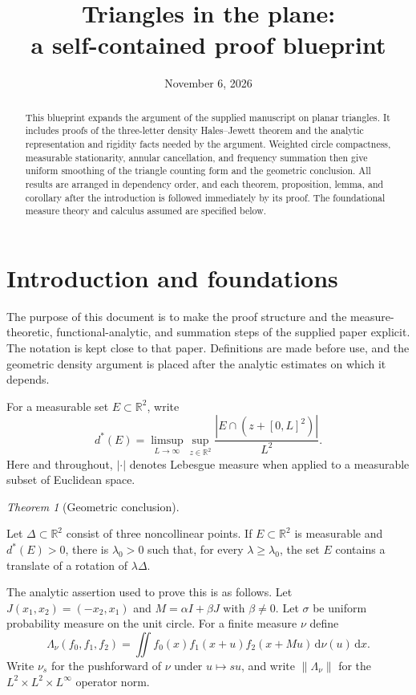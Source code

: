 \documentclass[11pt]{amsart}
\title[Blueprint: triangles in the plane]{Triangles in the plane:\\a self-contained proof blueprint}
\author{}
\date{November 6, 2026}
\newcommand{\R}{\mathbb R}
\newcommand{\dd}{\,\mathrm d}
\theoremstyle{definition}
\theoremstyle{remark}
\newtheorem{maintheorem}{Theorem}
\numberwithin{equation}{section}
\providecommand{\lean}[1]{}
\providecommand{\leanok}{}
\begin{document}
\begin{abstract}
This blueprint expands the argument of the supplied manuscript on planar
triangles.  It includes proofs of the three-letter density Hales--Jewett
theorem and the analytic representation and rigidity facts needed by the
argument.  Weighted circle compactness, measurable stationarity, annular
cancellation, and frequency summation then give uniform smoothing of the
triangle counting form and the geometric conclusion.  All results are
arranged in dependency order, and each theorem, proposition, lemma, and
corollary after the introduction is followed immediately by its proof.
The foundational measure theory and calculus assumed are specified below.
\end{abstract}
\maketitle
\tableofcontents

\section{Introduction and foundations}\label{sec:introduction}

The purpose of this document is to make the proof structure and the
measure-theoretic, functional-analytic, and summation steps of the supplied
paper explicit.  The notation is kept close to that paper.  Definitions
are made before use, and the geometric density argument is placed after
the analytic estimates on which it depends.

For a measurable set $E\subset\R^2$, write
\[
 d^*(E)=\limsup_{L\to\infty}\sup_{z\in\R^2}
       \frac{|E\cap(z+[0,L]^2)|}{L^2}.
\]
Here and throughout, $|\cdot|$ denotes Lebesgue measure when applied
to a measurable subset of Euclidean space.

\begin{maintheorem}[Geometric conclusion]\label{intro:density}
\lean{Auto.intro_density}
\leanok
Let $\Delta\subset\R^2$ consist of three noncollinear points.  If
$E\subset\R^2$ is measurable and $d^*(E)>0$, there is $\lambda_0>0$
such that, for every $\lambda\ge\lambda_0$, the set $E$ contains a
translate of a rotation of $\lambda\Delta$.
\end{maintheorem}

The analytic assertion used to prove this is as follows.  Let
$J(x_1,x_2)=(-x_2,x_1)$ and $M=\alpha I+\beta J$ with $\beta\ne0$.
Let $\sigma$ be uniform probability measure on the unit circle.  For
a finite measure $\nu$ define
\[
 \Lambda_\nu(f_0,f_1,f_2)
  =\iint f_0(x)f_1(x+u)f_2(x+Mu)\dd\nu(u)\dd x.
\]
Write $\nu_s$ for the pushforward of $\nu$ under $u\mapsto su$,
and write $\|\Lambda_\nu\|$ for the
$L^2\times L^2\times L^\infty$ operator norm.
\end{document}
